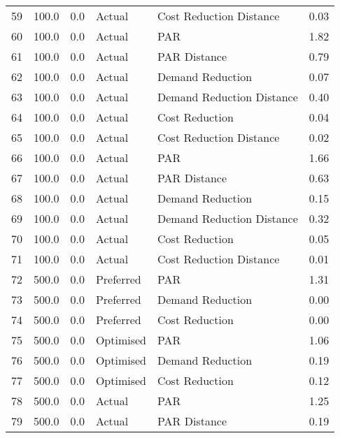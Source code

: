 \begin{longtable}{lrrllr}
59   &        100.0 &     0.0 &         Actual &    Cost Reduction Distance &   0.03 \\
60   &        100.0 &     0.0 &         Actual &                        PAR &   1.82 \\
61   &        100.0 &     0.0 &         Actual &               PAR Distance &   0.79 \\
62   &        100.0 &     0.0 &         Actual &           Demand Reduction &   0.07 \\
63   &        100.0 &     0.0 &         Actual &  Demand Reduction Distance &   0.40 \\
64   &        100.0 &     0.0 &         Actual &             Cost Reduction &   0.04 \\
65   &        100.0 &     0.0 &         Actual &    Cost Reduction Distance &   0.02 \\
66   &        100.0 &     0.0 &         Actual &                        PAR &   1.66 \\
67   &        100.0 &     0.0 &         Actual &               PAR Distance &   0.63 \\
68   &        100.0 &     0.0 &         Actual &           Demand Reduction &   0.15 \\
69   &        100.0 &     0.0 &         Actual &  Demand Reduction Distance &   0.32 \\
70   &        100.0 &     0.0 &         Actual &             Cost Reduction &   0.05 \\
71   &        100.0 &     0.0 &         Actual &    Cost Reduction Distance &   0.01 \\
72   &        500.0 &     0.0 &      Preferred &                        PAR &   1.31 \\
73   &        500.0 &     0.0 &      Preferred &           Demand Reduction &   0.00 \\
74   &        500.0 &     0.0 &      Preferred &             Cost Reduction &   0.00 \\
75   &        500.0 &     0.0 &      Optimised &                        PAR &   1.06 \\
76   &        500.0 &     0.0 &      Optimised &           Demand Reduction &   0.19 \\
77   &        500.0 &     0.0 &      Optimised &             Cost Reduction &   0.12 \\
78   &        500.0 &     0.0 &         Actual &                        PAR &   1.25 \\
79   &        500.0 &     0.0 &         Actual &               PAR Distance &   0.19 \\

\end{longtable}
